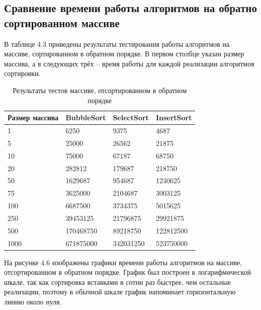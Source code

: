 \subsection{Сравнение времени работы алгоритмов на обратно сортированном массиве}

В таблице 4.3 приведены результаты тестирования работы алгоритмов на массиве, сортированном в обратном порядке.
В первом столбце указан размер массива, а в следующих трёх -- время работы для каждой
реализации алгоритмов сортировки.

\FloatBarrier
\begin{table}[h]
	\caption{Результаты тестов массиве, отсортированном в обратном порядке}
	\centering
	\begin{tabular}{ | l | l | l | l |}
		\hline
		Размер массива & BubbleSort & SelectSort & InsertSort \\ \hline
		1 & 6250 & 9375 & 4687 \\
		5 & 25000 & 26562 & 21875  \\
		10 & 75000 & 67187 & 68750 \\
		20 & 282812 & 179687 & 218750 \\
		50 & 1629687 & 954687 & 1240625 \\
		75 & 3625000 & 2104687 & 3003125 \\
		100 & 6687500 & 3734375 & 5015625 \\
		250 & 39453125 & 21796875 & 29921875 \\
		500 & 170468750 & 89218750 & 122812500 \\
		1000 & 671875000 & 342031250 & 523750000 \\
		\hline
	\end{tabular}
\end{table}
\FloatBarrier

На рисунке 4.6 изображены графики времени работы алгоритмов на массиве, отсортированном в обратном порядке.
График был построен в логарифмической шкале, так как сортировка вставками в сотни раз быстрее, чем
остальные реализации, поэтому в обычной шкале график напоминает горизонтальную линию около нуля.

